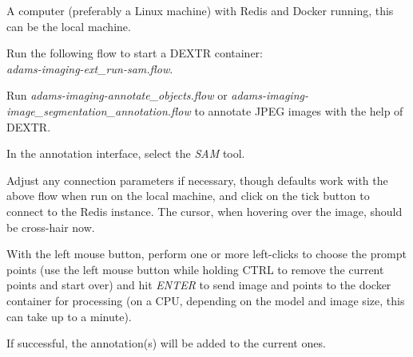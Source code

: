 \documentclass[a4paper]{book}
\begin{document}
\begin{tight_itemize}
  \item A computer (preferably a Linux machine) with Redis\cite{redis} and Docker\cite{docker} running,
  this can be the local machine.
  \item Run the following flow to start a DEXTR container: \\
  \textit{adams-imaging-ext\_run-sam.flow}.
  \item Run \textit{adams-imaging-annotate\_objects.flow} or \textit{adams-imaging-image\_segmentation\_annotation.flow}
  to annotate JPEG images with the help of DEXTR.
  \begin{tight_itemize}
    \item In the annotation interface, select the \textit{SAM} tool.
    \item Adjust any connection parameters if necessary, though defaults work with the above flow when run on the
    local machine, and click on the tick button to connect to the Redis instance. The cursor, when hovering over
    the image, should be cross-hair now.
    \item With the left mouse button, perform one or more left-clicks to choose the prompt points (use the left mouse
    button while holding CTRL to remove the current points and start over) and hit \textit{ENTER} to send image and
    points to the docker container for processing (on a CPU, depending on the model and image size, this can take up to a minute).
    \item If successful, the annotation(s) will be added to the current ones.
  \end{tight_itemize}
\end{tight_itemize}



\end{document}
